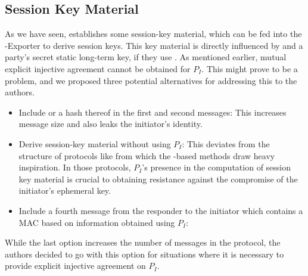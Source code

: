 \documentclass[runningheads]{llncs}
\begin{document}
\subsection{Session Key Material}
\label{sec:sessionKeyMaterial}
As we have seen, \mEdhoc{} establishes some
session-key material, which can be fed into the \mEdhoc{}-Exporter to derive
session keys.
%
This key material is directly influenced by \mGxy{} and a party's secret static
long-term key, if they use \mStat{}.
%
As mentioned earlier, mutual explicit injective agreement cannot be obtained for
$P_{I}$.
%
This might prove to be a problem, and we proposed three potential alternatives
for addressing this to the \mEdhoc{} authors.
%
\begin{itemize}
    \item Include \mIdcredi{} or a hash thereof in the first and
    second messages:
%
    This increases message size and also leaks the initiator's identity.
%
    \item Derive session-key material without using $P_{I}$:
%
    This deviates from the structure of protocols like \mOptls{} from which the
    \mStat{}-based methods draw heavy inspiration.
%
    In those protocols, $P_{I}$'s presence in the computation of session key
    material is crucial to obtaining resistance against the compromise of the
    initiator's ephemeral key.
%
    \item Include a fourth message from the
    responder to the initiator which contains a MAC based on information
    obtained using $P_{I}$:
\end{itemize}
%
While the last option increases the number of messages in the protocol, the
\mEdhoc{} authors decided to go with this option for situations where it is
necessary to provide explicit injective agreement on $P_{I}$.
%

\end{document}
